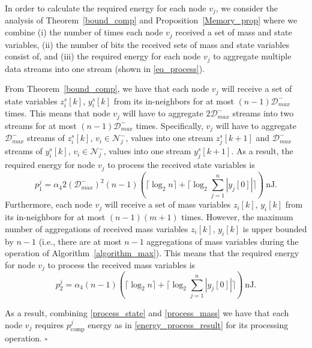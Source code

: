 \documentclass[twocolumn]{autart}    %
\begin{document}
\begin{pf}
In order to calculate the required energy for each node $v_j$, we consider the analysis of Theorem~\ref{bound_comp} and Proposition~\ref{Memory_prop} where we combine (i) the number of times each node $v_j$ received a set of mass and state variables, (ii) the number of bits the received sets of mass and state variables consist of, and (iii) the required energy for each node $v_j$ to aggregate multiple data streams into one stream (shown in \eqref{eq_process}). 

From Theorem~\ref{bound_comp}, we have that each node $v_j$ will receive a set of state variables $z^s_i[k]$, $y^s_i[k]$ from its in-neighbors for at most $(n-1)\mathcal{D}_{max}^-$ times. 
This means that node $v_j$ will have to aggregate $2 \mathcal{D}_{max}^-$ streams into two streams for at most $(n-1)\mathcal{D}_{max}^-$ times. 
Specifically, $v_j$ will have to aggregate $\mathcal{D}_{max}^-$ streams of $z^s_i[k]$, $v_i \in \mathcal{N}_j^-$, values into one stream $z^s_j[k+1]$ and $\mathcal{D}_{max}^-$ streams of $y^s_i[k]$, $v_i \in \mathcal{N}_j^-$, values into one stream $y^s_j[k+1]$. 
As a result, the required energy for node $v_j$ to process the received state variables is 
\begin{equation}\label{process_state}
p_1^j = \alpha_4 2(\mathcal{D}_{max}^-)^2 (n-1) (\lceil \log_{2} n \rceil + \lceil \log_{2} \sum_{j=1}^n | y_j[0] | \rceil) \ \text{nJ} .  
\end{equation}
Furthermore, each node $v_j$ will receive a set of mass variables $z_i[k]$, $y_i[k]$ from its in-neighbors for at most $(n-1)(m+1)$ times. 
However, the maximum number of aggregations of received mass variables $z_i[k]$, $y_i[k]$ is upper bounded by $n-1$ (i.e., there are at most $n-1$ aggregations of mass variables during the operation of Algorithm~\ref{algorithm_max}). 
This means that the required energy for node $v_j$ to process the received mass variables is 
\begin{equation}\label{process_mass}
p_2^j = \alpha_4 (n-1) (\lceil \log_{2} n \rceil + \lceil \log_{2} \sum_{j=1}^n | y_j[0] | \rceil) \ \text{nJ} .  
\end{equation}

As a result, combining \eqref{process_state} and \eqref{process_mass} we have that each node $v_j$ requires $p^j_{\text{comp}}$ energy as in \eqref{energy_process_result} for its processing operation. \hspace*{\fill} $\square$
\end{pf}
\end{document}
